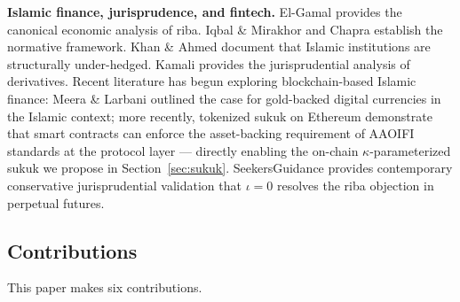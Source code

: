 \documentclass[10pt,twocolumn]{article}
\theoremstyle{plain}
\theoremstyle{definition}
\begin{document}
\textbf{Islamic finance, jurisprudence, and fintech.}
El-Gamal \cite{ElGamal2006} provides the canonical economic analysis of riba.
Iqbal \& Mirakhor \cite{IqbalMirakhor2011} and Chapra \cite{Chapra1985}
establish the normative framework. Khan \& Ahmed \cite{KhanAhmed2001} document
that Islamic institutions are structurally under-hedged.
Kamali \cite{Kamali2007} provides the jurisprudential analysis of derivatives.
Recent literature has begun exploring blockchain-based Islamic finance:
Meera \& Larbani \cite{MeeraLarbani2009} outlined the case for gold-backed
digital currencies in the Islamic context; more recently, tokenized sukuk
on Ethereum \cite{TokenizedSukuk2022} demonstrate that smart contracts can
enforce the asset-backing requirement of AAOIFI standards at the protocol
layer --- directly enabling the on-chain $\kappa$-parameterized sukuk we
propose in Section~\ref{sec:sukuk}.
SeekersGuidance \cite{SeekersGuidance2025} provides contemporary conservative
jurisprudential validation that $\iota = 0$ resolves the riba objection in
perpetual futures.

\subsection*{Contributions}

This paper makes six contributions.
\end{document}

